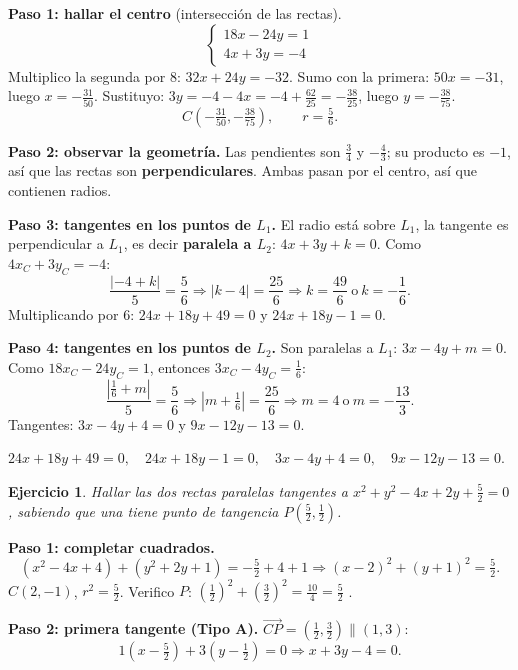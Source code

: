 \documentclass[11pt,a4paper]{article}
\theoremstyle{ej}
\newtheorem{ejercicio}{Ejercicio}[section]
\begin{document}
\textbf{Paso 1: hallar el centro} (intersección de las rectas).
\[
\begin{cases} 18x-24y=1\\ 4x+3y=-4\end{cases}
\]
Multiplico la segunda por 8: $32x+24y=-32$. Sumo con la primera: $50x=-31$, luego
$x=-\tfrac{31}{50}$. Sustituyo: $3y=-4-4x=-4+\tfrac{62}{25}=-\tfrac{38}{25}$, luego $y=-\tfrac{38}{75}$.
\[ C\left(-\tfrac{31}{50},-\tfrac{38}{75}\right),\qquad r=\tfrac56. \]

\textbf{Paso 2: observar la geometría.} Las pendientes son $\tfrac34$ y $-\tfrac43$; su producto es $-1$,
así que las rectas son \textbf{perpendiculares}. Ambas pasan por el centro, así que contienen radios.

\textbf{Paso 3: tangentes en los puntos de $L_1$.} El radio está sobre $L_1$, la tangente es
perpendicular a $L_1$, es decir \textbf{paralela a $L_2$}: $4x+3y+k=0$. Como $4x_C+3y_C=-4$:
\[
\frac{|-4+k|}{5}=\frac56\Rightarrow |k-4|=\frac{25}{6}\Rightarrow k=\frac{49}{6}\ \text{o}\ k=-\frac16.
\]
Multiplicando por 6: \textbf{$24x+18y+49=0$} y \textbf{$24x+18y-1=0$}.

\textbf{Paso 4: tangentes en los puntos de $L_2$.} Son paralelas a $L_1$: $3x-4y+m=0$.
Como $18x_C-24y_C=1$, entonces $3x_C-4y_C=\tfrac16$:
\[
\frac{|\frac16+m|}{5}=\frac56\Rightarrow \left|m+\tfrac16\right|=\frac{25}{6}\Rightarrow m=4\ \text{o}\ m=-\frac{13}{3}.
\]
Tangentes: \textbf{$3x-4y+4=0$} y \textbf{$9x-12y-13=0$}.

\begin{respuesta}
$24x+18y+49=0,\quad 24x+18y-1=0,\quad 3x-4y+4=0,\quad 9x-12y-13=0.$
\end{respuesta}

\begin{ejercicio}
Hallar las dos rectas paralelas tangentes a $x^2+y^2-4x+2y+\tfrac52=0$, sabiendo que una
tiene punto de tangencia $P\left(\tfrac52,\tfrac12\right)$.
\end{ejercicio}

\textbf{Paso 1: completar cuadrados.}
\[ (x^2-4x+4)+(y^2+2y+1)=-\tfrac52+4+1 \Rightarrow (x-2)^2+(y+1)^2=\tfrac52. \]
$C(2,-1)$, $r^2=\tfrac52$. Verifico $P$: $\left(\tfrac12\right)^2+\left(\tfrac32\right)^2=\tfrac{10}{4}=\tfrac52$ \checkmark.

\textbf{Paso 2: primera tangente (Tipo A).} $\overrightarrow{CP}=\left(\tfrac12,\tfrac32\right)\parallel(1,3)$:
\[ 1\left(x-\tfrac52\right)+3\left(y-\tfrac12\right)=0\Rightarrow \boxed{x+3y-4=0}. \]
\end{document}
